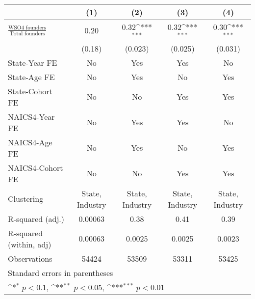 {
\def\sym#1{\ifmmode^{#1}\else\(^{#1}\)\fi}
\begin{tabular}{l*{4}{c}}
\toprule
                    &\multicolumn{1}{c}{(1)}         &\multicolumn{1}{c}{(2)}         &\multicolumn{1}{c}{(3)}         &\multicolumn{1}{c}{(4)}         \\
\midrule
$\frac{\text{WSO4 founders}}{\text{Total founders}}$&        0.20         &        0.32\sym{***}&        0.32\sym{***}&        0.30\sym{***}\\
                    &      (0.18)         &     (0.023)         &     (0.025)         &     (0.031)         \\
\addlinespace
State-Year FE       &          No         &         Yes         &         Yes         &          No         \\
\addlinespace
State-Age FE        &          No         &         Yes         &          No         &         Yes         \\
\addlinespace
State-Cohort FE     &          No         &          No         &         Yes         &         Yes         \\
\addlinespace
NAICS4-Year FE      &          No         &         Yes         &         Yes         &          No         \\
\addlinespace
NAICS4-Age FE       &          No         &         Yes         &          No         &         Yes         \\
\addlinespace
NAICS4-Cohort FE    &          No         &          No         &         Yes         &         Yes         \\
\midrule
Clustering          &State, Industry         &State, Industry         &State, Industry         &State, Industry         \\
R-squared (adj.)    &     0.00063         &        0.38         &        0.41         &        0.39         \\
R-squared (within, adj)&     0.00063         &      0.0025         &      0.0025         &      0.0023         \\
Observations        &       54424         &       53509         &       53311         &       53425         \\
\bottomrule
\multicolumn{5}{l}{\footnotesize Standard errors in parentheses}\\
\multicolumn{5}{l}{\footnotesize \sym{*} \(p<0.1\), \sym{**} \(p<0.05\), \sym{***} \(p<0.01\)}\\
\end{tabular}
}
